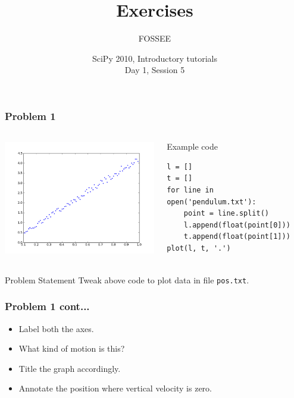 \documentclass[14pt,compress]{beamer}
\title[Exercises]{Exercises}
\author[FOSSEE] {FOSSEE}
\institute[IIT Bombay] {Department of Aerospace Engineering\\IIT Bombay}
\date[] {SciPy 2010, Introductory tutorials\\Day 1, Session 5}
\newcommand{\typ}[1]{\lstinline{#1}}
\begin{document}
\begin{frame}
  \titlepage
\end{frame}


\begin{frame}[fragile]
  \frametitle{Problem 1}
  \begin{columns}
    \hspace*{-0.5in}
    \includegraphics[height=2in, interpolate=true]{data/L-Tsq.png}
    \begin{block}{Example code}
    \tiny
    \begin{lstlisting}
l = []
t = []
for line in open('pendulum.txt'):
    point = line.split()
    l.append(float(point[0]))
    t.append(float(point[1]))
plot(l, t, '.')
    \end{lstlisting}
    \end{block}
  \end{columns}
  \begin{block}{Problem Statement}
      Tweak above code to plot data in file \typ{pos.txt}.
  \end{block}
\end{frame}

\begin{frame}
  \frametitle{Problem 1 cont...}
  \begin{itemize}
  \item Label both the axes.
  \item What kind of motion is this?
  \item Title the graph accordingly.
  \item Annotate the position where vertical velocity is zero.
  \end{itemize}
\end{frame}
\end{document}
